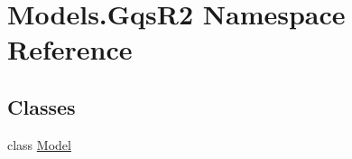 \hypertarget{namespace_models_1_1_gqs_r2}{\section{Models.\-Gqs\-R2 Namespace Reference}
\label{namespace_models_1_1_gqs_r2}
}
\subsection*{Classes}
\begin{DoxyCompactItemize}
\item 
class \hyperlink{class_models_1_1_gqs_r2_1_1_model}{Model}
\end{DoxyCompactItemize}
